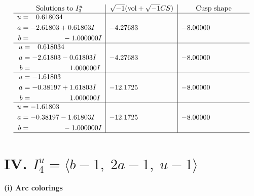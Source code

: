 \documentclass[1p]{elsarticle_modified}
\theoremstyle{definition}
\newcommand{\I}{\sqrt{-1}}
\begin{document}
$$\begin{array}{c|c|c}  
\text{Solutions to }I^u_{3}& \I (\text{vol} + \sqrt{-1}CS) & \text{Cusp shape}\\
 \hline 
\begin{aligned}
u &= \phantom{-}0.618034\phantom{ +0.000000I} \\
a &= -2.61803 + 0.61803 I \\
b &= \phantom{-0.000000 } -1.000000 I\end{aligned}
 & -4.27683\phantom{ +0.000000I} & -8.00000\phantom{ +0.000000I} \\ \hline\begin{aligned}
u &= \phantom{-}0.618034\phantom{ +0.000000I} \\
a &= -2.61803 - 0.61803 I \\
b &= \phantom{-0.000000 -}1.000000 I\end{aligned}
 & -4.27683\phantom{ +0.000000I} & -8.00000\phantom{ +0.000000I} \\ \hline\begin{aligned}
u &= -1.61803\phantom{ +0.000000I} \\
a &= -0.38197 + 1.61803 I \\
b &= \phantom{-0.000000 -}1.000000 I\end{aligned}
 & -12.1725\phantom{ +0.000000I} & -8.00000\phantom{ +0.000000I} \\ \hline\begin{aligned}
u &= -1.61803\phantom{ +0.000000I} \\
a &= -0.38197 - 1.61803 I \\
b &= \phantom{-0.000000 } -1.000000 I\end{aligned}
 & -12.1725\phantom{ +0.000000I} & -8.00000\phantom{ +0.000000I}\\
 \hline 
 \end{array}$$\newpage\newpage\renewcommand{\arraystretch}{1}
\centering \section*{IV. $I^u_{4}= \langle b-1,\;2 a-1,\;u-1 \rangle$}
\flushleft \textbf{(i) Arc colorings}\\
\end{document}
